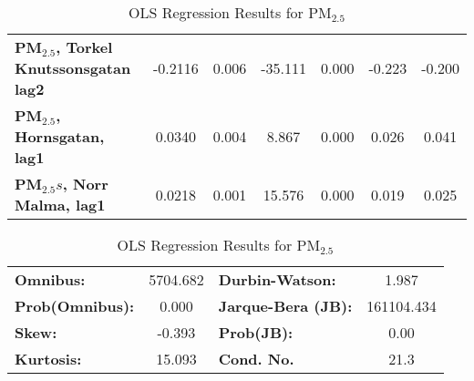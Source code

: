\begin{landscape}
\begin{table}[h]
\begin{center}
\begin{tabular}{lcccccc}
\textbf{PM$_{2.5}$, Torkel Knutssonsgatan lag2} &      -0.2116  &        0.006     &   -35.111  &         0.000        &       -0.223    &       -0.200     \\
\textbf{PM$_{2.5}$, Hornsgatan, lag1}           &       0.0340  &        0.004     &     8.867  &         0.000        &        0.026    &        0.041     \\
\textbf{PM$_{2.5}s$, Norr Malma, lag1}           &       0.0218  &        0.001     &    15.576  &         0.000        &        0.019    &        0.025     \\
\bottomrule
\end{tabular}
\begin{tabular}{lclc}
\textbf{Omnibus:}       & 5704.682 & \textbf{  Durbin-Watson:     } &     1.987   \\
\textbf{Prob(Omnibus):} &   0.000  & \textbf{  Jarque-Bera (JB):  } & 161104.434  \\
\textbf{Skew:}          &  -0.393  & \textbf{  Prob(JB):          } &      0.00   \\
\textbf{Kurtosis:}      &  15.093  & \textbf{  Cond. No.          } &      21.3   \\
\bottomrule
\end{tabular}
\caption{OLS Regression Results for PM$_{2.5}$}
\end{center}
\end{table}
\end{landscape}

